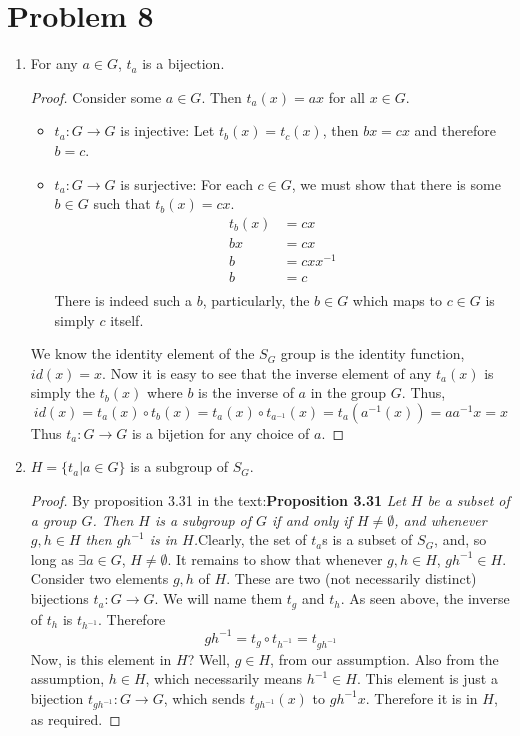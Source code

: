 \documentclass[a4paper,12pt]{extarticle}
\theoremstyle{definition}
\begin{document}
\section*{Problem 8}\begin{enumerate}[label=(\alph*)]
    \item For any $a\in G$, $t_a$ is a bijection.\begin{proof} Consider some $a\in G$. Then $t_a(x)=ax$ for all $x\in G$. \begin{itemize}
        \item $t_a:G\to G$ is injective: Let $t_b(x)=t_c(x)$, then $bx=cx$ and therefore $b=c$.
        \item $t_a:G\to G$ is surjective: For each $c\in G$, we must show that there is some $b\in G$ such that $t_b(x)=cx$. \begin{align*}
            t_b(x)&=cx\\
            bx&=cx\\
            b&=cxx^{-1}\\
            b&=c\\
        \end{align*} There is indeed such a $b$, particularly, the $b\in G$ which maps to $c\in G$ is simply $c$ itself.
    \end{itemize} We know the identity element of the $S_G$ group is the identity function, $id(x)=x$. Now it is easy to see that the inverse element of any $t_a(x)$ is simply the $t_b(x)$ where $b$ is the inverse of $a$ in the group $G$. Thus, $$id(x)=t_a(x)\circ t_b(x)=t_a(x)\circ t_{a^{-1}}(x)=t_a(a^{-1}(x))=aa^{-1}x=x$$ Thus $t_a:G\to G$ is a bijetion for any choice of $a$.
    \end{proof}
    \item $H=\{t_a|a\in G\}$ is a subgroup of $S_G$.\begin{proof}By proposition 3.31 in the text:\myskip \textbf{Proposition 3.31} \textit{Let $H$ be a subset of a group $G$. Then $H$ is a subgroup of $G$ if and only if $H \neq \emptyset$, and whenever $g, h \in H$ then $g h^{-1}$ is in $H$.}\myskip Clearly, the set of $t_a$s is a subset of $S_G$, and, so long as $\exists a\in G$, $H\neq\emptyset$. It remains to show that whenever $g,h\in H$, $gh^{-1}\in H$. Consider two elements $g,h$ of $H$. These are two (not necessarily distinct) bijections $t_a:G\to G$. We will name them $t_g$ and $t_h$. As seen above, the inverse of $t_h$ is $t_{h^{-1}}$. Therefore $$gh^{-1}=t_g\circ t_{h^{-1}}=t_{gh^{-1}}$$ Now, is this element in $H$? Well, $g\in H$, from our assumption. Also from the assumption, $h\in H$, which necessarily means $h^{-1}\in H$. This element is just a bijection $t_{gh^{-1}}:G\to G$, which sends $t_{gh^{-1}}(x)$ to $gh^{-1}x$. Therefore it is in $H$, as required.

\end{proof}
\end{enumerate}
\end{document}
